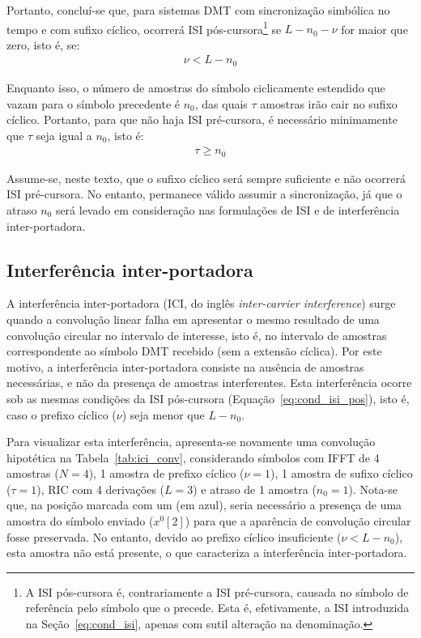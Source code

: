 Portanto, concluí-se que, para sistemas DMT com sincronização simbólica no tempo e com sufixo cíclico, ocorrerá ISI pós-cursora\footnote{A ISI pós-cursora é, contrariamente a ISI pré-cursora, causada no símbolo de referência pelo símbolo que o precede. Esta é, efetivamente, a ISI introduzida na Seção~\ref{eq:cond_isi}, apenas com sutil alteração na denominação. } se $L - n_0 - \nu$ for maior que zero, isto é, se:
\begin{align}
\nu < L - n_0
\label{eq:cond_isi_pos}
\end{align}

Enquanto isso, o número de amostras do símbolo ciclicamente estendido que vazam para o símbolo precedente é $n_0$, das quais $\tau$ amostras irão cair no sufixo cíclico. Portanto, para que não haja ISI pré-cursora, é necessário minimamente que $\tau$ seja igual a $n_0$, isto é:
\begin{align}
\tau \geq n_0
\end{align}

Assume-se, neste texto, que o sufixo cíclico será sempre suficiente e não ocorrerá ISI pré-cursora. No entanto, permanece válido assumir a sincronização, já que o atraso $n_0$ será levado em consideração nas formulações de ISI e de interferência inter-portadora. 

\subsection{Interferência inter-portadora}

A interferência inter-portadora (ICI, do inglês \emph{inter-carrier interference}) surge quando a convolução linear falha em apresentar o mesmo resultado de uma convolução circular no intervalo de interesse, isto é, no intervalo de amostras correspondente ao símbolo DMT recebido (sem a extensão cíclica). Por este motivo, a interferência inter-portadora consiste na ausência de amostras necessárias, e não da presença de amostras interferentes. Esta interferência ocorre sob as mesmas condições da ISI pós-cursora (Equação~\ref{eq:cond_isi_pos}), isto é, caso o prefixo cíclico ($\nu$) seja menor que $L - n_0$.

Para visualizar esta interferência, apresenta-se novamente uma convolução hipotética na Tabela~\ref{tab:ici_conv}, considerando símbolos com IFFT de 4 amostras ($N=4$), 1 amostra de prefixo cíclico ($\nu=1$), 1 amostra de sufixo cíclico ($\tau =1 $), RIC com 4 derivações ($L=3$) e atraso de 1 amostra ($n_0=1$). Nota-se que, na posição marcada com um  (em azul), seria necessário a presença de uma amostra do símbolo enviado ($x^0[2]$) para que a aparência de convolução circular fosse preservada. No entanto, devido ao prefixo cíclico insuficiente ($\nu < L - n_0$), esta amostra não está presente, o que caracteriza a interferência inter-portadora.

